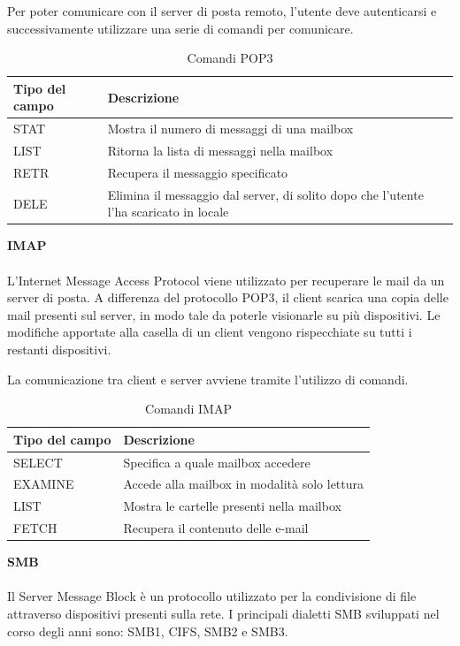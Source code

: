 \documentclass[12pt]{report}
\begin{document}
Per poter comunicare con il server di posta remoto, l'utente deve autenticarsi e successivamente utilizzare una serie di comandi per comunicare.
\begin{table}[htbp]
\centering
\begin{tabular}{@{}m{3cm}m{11cm}@{}}
\toprule
\textbf{Tipo del campo} & \textbf{Descrizione} \\ \midrule
STAT & Mostra il numero di messaggi di una mailbox \\ \hline
LIST & Ritorna la lista di messaggi nella mailbox \\ \hline
RETR & Recupera il messaggio specificato \\ \hline
DELE & Elimina il messaggio dal server, di solito dopo che l'utente l'ha scaricato in locale \\ \bottomrule
\end{tabular}
\caption{Comandi POP3}
\label{tab:comandi_POP3}
\end{table}

\newpage
\noindent
\textbf{IMAP}
\\\\
L'Internet Message Access Protocol viene utilizzato per recuperare le mail da un server di posta. A differenza del protocollo POP3, il client scarica una copia delle mail presenti sul server, in modo tale da poterle visionarle su più dispositivi. Le modifiche apportate alla casella di un client vengono rispecchiate su tutti i restanti dispositivi. \cite{rfcIMAP}

La comunicazione tra client e server avviene tramite l'utilizzo di comandi.
\begin{table}[htbp]
\centering
\begin{tabular}{@{}m{3cm}m{11cm}@{}}
\toprule
\textbf{Tipo del campo} & \textbf{Descrizione} \\ \midrule
SELECT & Specifica a quale mailbox accedere \\ \hline
EXAMINE & Accede alla mailbox in modalità solo lettura \\ \hline
LIST & Mostra le cartelle presenti nella mailbox \\ \hline
FETCH & Recupera il contenuto delle e-mail \\ \bottomrule
\end{tabular}
\caption{Comandi IMAP}
\label{tab:comandi_IMAP}
\end{table}

\noindent
\textbf{SMB}
\\\\
Il Server Message Block è un protocollo utilizzato per la condivisione di file attraverso dispositivi presenti sulla rete. I principali dialetti SMB sviluppati nel corso degli anni sono: SMB1, CIFS, SMB2 e SMB3.\cite{microsoftSMB}
\end{document}
